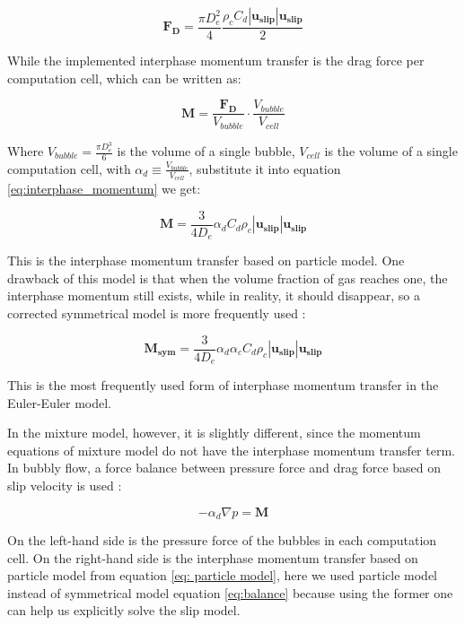 \begin{equation}
    \mathbf{F_D} = \frac{\pi D_e^2}{4} \frac{\rho_c C_d |\mathbf{u_{slip}}| \mathbf{u_{slip}}}{2}
\end{equation}

While the implemented interphase momentum transfer is the drag force per computation cell, which can be written as:

\begin{equation}\label{eq:interphase_momentum}
    \mathbf{M} = \frac{\mathbf{F_D}}{V_{bubble}} \cdot \frac{V_{bubble}}{V_{cell}}
\end{equation}

Where $V_{bubble} = \frac{\pi D_e^3}{6}$ is the volume of a single bubble, $V_{cell}$ is the volume of a single computation cell, with $\alpha_d \equiv \frac{V_{bubble}}{V_{cell}}$, substitute it into equation \ref{eq:interphase_momentum} we get:

\begin{equation}\label{eq: particle model}
    \mathbf{M} = \frac{3}{4D_e}\alpha_d C_d \rho_c |\mathbf{u_{slip}}|\mathbf{u_{slip}}
\end{equation}

This is the interphase momentum transfer based on particle model. One drawback of this model is that when the volume fraction of gas reaches one, the interphase momentum still exists, while in reality, it should disappear, so a corrected symmetrical model is more frequently used \cite{ANSYSFLUENT13UsersGuide2013}:

\begin{equation}\label{eq:balance}
    \mathbf{M_{sym}} = \frac{3}{4D_e}\alpha_d\alpha_c C_d \rho_c |\mathbf{u_{slip}}|\mathbf{u_{slip}}
\end{equation}

This is the most frequently used form of interphase momentum transfer in the Euler-Euler model.

In the mixture model, however, it is slightly different, since the momentum equations of mixture model do not have the interphase momentum transfer term. In bubbly flow, a force balance between pressure force and drag force based on slip velocity is used \cite{kuzmin2000efficient}:

\begin{equation}
    -\alpha_d \nabla p = \mathbf{M}
\end{equation}

On the left-hand side is the pressure force of the bubbles in each computation cell. On the right-hand side is the interphase momentum transfer based on particle model from equation \ref{eq: particle model}, here we used particle model instead of symmetrical model equation \ref{eq:balance} because using the former one can help us explicitly solve the slip model.



